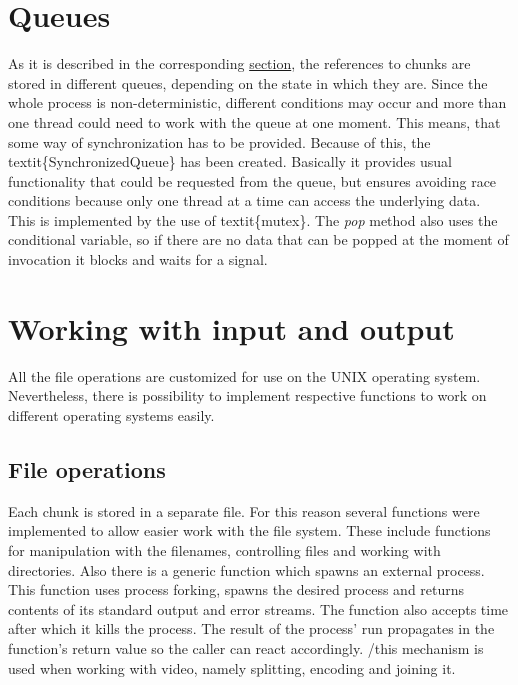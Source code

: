 \section{Queues}\label{queues}

As it is described in the corresponding
\hyperref[distribution-of-chunks]{section}, the references to chunks are
stored in different queues, depending on the state in which they are.
Since the whole process is non-deterministic, different conditions may
occur and more than one thread could need to work with the queue at one
moment. This means, that some way of synchronization has to be provided.
Because of this, the textit\{SynchronizedQueue\} has been created.
Basically it provides usual functionality that could be requested from
the queue, but ensures avoiding race conditions because only one thread
at a time can access the underlying data. This is implemented by the use
of textit\{mutex\}. The \textit{pop} method also uses the conditional
variable, so if there are no data that can be popped at the moment of
invocation it blocks and waits for a signal.

\section{Working with input and
output}\label{working-with-input-and-output}

All the file operations are customized for use on the UNIX operating
system. Nevertheless, there is possibility to implement respective
functions to work on different operating systems easily.

\subsection*{File operations}

Each chunk is stored in a separate file. For this reason several
functions were implemented to allow easier work with the file system.
These include functions for manipulation with the filenames, controlling
files and working with directories. Also there is a generic function
which spawns an external process. This function uses process forking,
spawns the desired process and returns contents of its standard output
and error streams. The function also accepts time after which it kills
the process. The result of the process' run propagates in the function's
return value so the caller can react accordingly. /this mechanism is
used when working with video, namely splitting, encoding and joining it.

